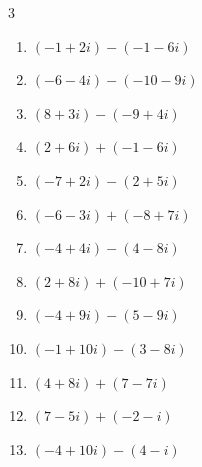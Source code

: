 \begin{multicols}{3}
\begin{enumerate}
  \item $\displaystyle (-1+2i) - (-1-6i)$

        \phantom{$\displaystyle =8i$}

  \item $\displaystyle (-6-4i) - (-10-9i)$

        \phantom{$\displaystyle =4+5i$}

  \item $\displaystyle (8+3i) - (-9+4i)$

        \phantom{$\displaystyle =17-i$}

  \item $\displaystyle (2+6i) + (-1-6i)$

        \phantom{$\displaystyle =1$}

  \item $\displaystyle (-7+2i) - (2+5i)$

        \phantom{$\displaystyle =-9-3i$}

  \item $\displaystyle (-6-3i) + (-8+7i)$

        \phantom{$\displaystyle =-14+4i$}

  \item $\displaystyle (-4+4i) - (4-8i)$

        \phantom{$\displaystyle =-8+12i$}

  \item $\displaystyle (2+8i) + (-10+7i)$

        \phantom{$\displaystyle =-8+15i$}

  \item $\displaystyle (-4+9i) - (5-9i)$

        \phantom{$\displaystyle =-9+18i$}

  \item $\displaystyle (-1+10i) - (3-8i)$

        \phantom{$\displaystyle =-4+18i$}

  \item $\displaystyle (4+8i) + (7-7i)$

        \phantom{$\displaystyle =11+i$}

  \item $\displaystyle (7-5i) + (-2-i)$

        \phantom{$\displaystyle =5-6i$}

  \item $\displaystyle (-4+10i) - (4-i)$

        \phantom{$\displaystyle =-8+11i$}


\end{enumerate}
\end{multicols}
